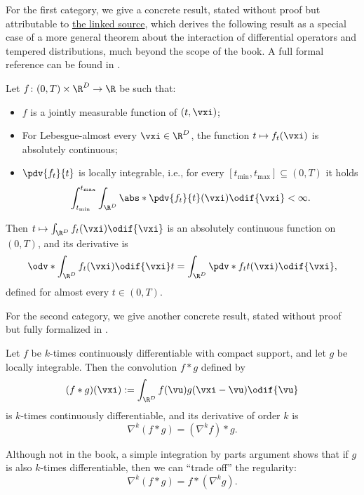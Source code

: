 \documentclass[../../book-main.tex]{subfiles}
\begin{document}
For the first category, we give a concrete result, stated without proof but attributable to \href{https://planetmath.org/differentiationundertheintegralsign}{the linked source}, which derives the following result as a special case of a more general theorem about the interaction of differential operators and tempered distributions, much beyond the scope of the book. A full formal reference can be found in \cite{jones1982theory}.
\begin{proposition}\label{prop:dutis}
    Let \(f \colon (0, T) \times \R^{D} \to \R\) be such that:
    \begin{itemize}
        \item \(f\) is a jointly measurable function of \((t, \vxi)\);
        \item For Lebesgue-almost every \(\vxi \in \R^{D}\), the function \(t \mapsto f_{t}(\vxi)\) is absolutely continuous;
        \item \(\pdv{f_{t}}{t}\) is locally integrable, i.e., for every \([t_{\min}, t_{\max}] \subseteq (0, T)\) it holds 
        \begin{equation}
            \int_{t_{\min}}^{t_{\max}}\int_{\R^{D}}\abs*{\pdv{f_{t}}{t}(\vxi)}\odif{\vxi} < \infty.
        \end{equation}
    \end{itemize}
    Then \(t \mapsto \int_{\R^{D}}f_{t}(\vxi)\odif{\vxi}\) is an absolutely continuous function on \((0, T)\), and its derivative is 
    \begin{equation}
        \odv*{\int_{\R^{D}}f_{t}(\vxi)\odif{\vxi}}{t} = \int_{\R^{D}}\pdv*{f_{t}}{t}(\vxi)\odif{\vxi},
    \end{equation}
    defined for almost every \(t \in (0, T)\).
\end{proposition}

For the second category, we give another concrete result, stated without proof but fully formalized in \cite{brezis2011functional}.
\begin{proposition}\label{prop:diff_convolution}
    Let \(f\) be \(k\)-times continuously differentiable with compact support, and let \(g\) be locally integrable. Then the convolution \(f * g\) defined by
    \begin{equation}
        (f * g)(\vxi) := \int_{\R^{D}}f(\vu)g(\vxi - \vu)\odif{\vu}
    \end{equation}
    is \(k\)-times continuously differentiable, and its derivative of order \(k\) is 
    \begin{equation}
        \nabla^{k}(f * g) =(\nabla^{k}f) * g. 
    \end{equation}
\end{proposition}
Although not in the book, a simple integration by parts argument shows that if \(g\) is also \(k\)-times differentiable, then we can ``trade off'' the regularity:
\begin{equation}
    \nabla^{k}(f * g) = f * (\nabla^{k} g).
\end{equation}
\end{document}
